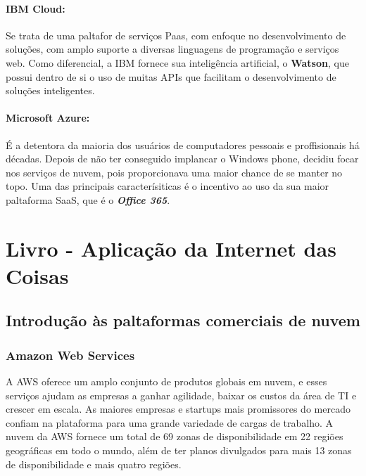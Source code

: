 \documentclass[12pt, a4paper]{paper}
\begin{document}
\paragraph{IBM Cloud:} %
\label{par:IBM Cloud:}
Se trata de uma paltafor de serviços Paas, com enfoque no desenvolvimento de soluções,
com amplo suporte a diversas linguagens de programação e serviços web. 
Como diferencial, a IBM fornece sua inteligência artificial, o \textbf{Watson}, que 
possui dentro de si o uso de muitas APIs que facilitam o desenvolvimento de soluções 
inteligentes.

\paragraph{Microsoft Azure:} %
\label{par:Microsoft Azure:}
É a detentora da maioria dos usuários de computadores pessoais e proffisionais há 
décadas. Depois de não ter conseguido implancar o Windows phone, decidiu focar nos 
serviços de nuvem, pois proporcionava uma maior chance de se manter no topo. 
Uma das principais caracterísiticas é o incentivo ao uso da sua maior paltaforma SaaS, 
que é o \textit{\textbf{Office 365}}. 

\section{Livro - Aplicação da Internet das Coisas} %
\label{sec:Livro - Aplicação da Internet das Coisas}

\subsection{Introdução às paltaformas comerciais de nuvem} %
\label{sub:Introdução às paltaformas comerciais de nuvem}

  \subsubsection{Amazon Web Services } %
  \label{sec:Amazon Web Services }
  A AWS oferece um amplo conjunto de produtos globais em nuvem, e esses serviços 
  ajudam as empresas a ganhar agilidade, baixar os custos da área de TI e crescer em 
  escala. As maiores empresas e startups mais promissores do mercado confiam na 
  plataforma para uma grande variedade de cargas de trabalho. A nuvem da AWS fornece 
  um total de 69 zonas de disponibilidade em 22 regiões geográficas em todo o mundo, 
  além de ter planos divulgados para mais 13 zonas de disponibilidade e mais quatro 
  regiões.
\end{document}
